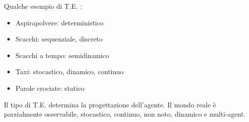 Qualche esempio di T.E. :

\begin{itemize}
 \item Aspirapolvere: deterministico
 \item Scacchi: sequenziale, discreto
 \item Scacchi a tempo: semidinamico
 \item Taxi: stocastico, dinamico, continuo
 \item Parole crociate: statico
\end{itemize}

Il tipo di T.E. determina la progettazione dell'agente.
Il mondo reale è parzialmente osservabile, stocastico, continuo, non noto,
dinamico e multi-agent.
